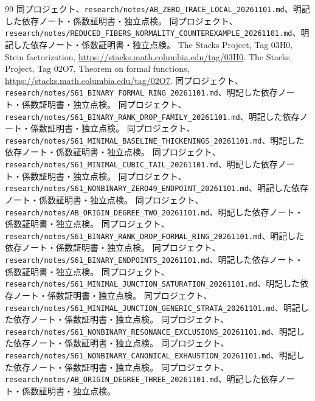 \documentclass[11pt,a4paper]{ltjsarticle}
\theoremstyle{remark}
\begin{document}
\begin{thebibliography}{99}
 同プロジェクト、\nolinkurl{research/notes/AB_ZERO_TRACE_LOCAL_20261101.md}、明記した依存ノート・係数証明書・独立点検。
 同プロジェクト、\nolinkurl{research/notes/REDUCED_FIBERS_NORMALITY_COUNTEREXAMPLE_20261101.md}、明記した依存ノート・係数証明書・独立点検。
 The Stacks Project, Tag 03H0, Stein factorization, \url{https://stacks.math.columbia.edu/tag/03H0}.
 The Stacks Project, Tag 02O7, Theorem on formal functions, \url{https://stacks.math.columbia.edu/tag/02O7}.
 同プロジェクト、\nolinkurl{research/notes/S61_BINARY_FORMAL_RING_20261101.md}、明記した依存ノート・係数証明書・独立点検。
 同プロジェクト、\nolinkurl{research/notes/S61_BINARY_RANK_DROP_FAMILY_20261101.md}、明記した依存ノート・係数証明書・独立点検。
 同プロジェクト、\nolinkurl{research/notes/S61_MINIMAL_BASELINE_THICKENINGS_20261101.md}、明記した依存ノート・係数証明書・独立点検。
 同プロジェクト、\nolinkurl{research/notes/S61_MINIMAL_CUBIC_TAIL_20261101.md}、明記した依存ノート・係数証明書・独立点検。
 同プロジェクト、\nolinkurl{research/notes/S61_NONBINARY_ZERO49_ENDPOINT_20261101.md}、明記した依存ノート・係数証明書・独立点検。
 同プロジェクト、\nolinkurl{research/notes/AB_ORIGIN_DEGREE_TWO_20261101.md}、明記した依存ノート・係数証明書・独立点検。
 同プロジェクト、\nolinkurl{research/notes/S61_BINARY_RANK_DROP_FORMAL_RING_20261101.md}、明記した依存ノート・係数証明書・独立点検。
 同プロジェクト、\nolinkurl{research/notes/S61_BINARY_ENDPOINTS_20261101.md}、明記した依存ノート・係数証明書・独立点検。
 同プロジェクト、\nolinkurl{research/notes/S61_MINIMAL_JUNCTION_SATURATION_20261101.md}、明記した依存ノート・係数証明書・独立点検。
 同プロジェクト、\nolinkurl{research/notes/S61_MINIMAL_JUNCTION_GENERIC_STRATA_20261101.md}、明記した依存ノート・係数証明書・独立点検。
 同プロジェクト、\nolinkurl{research/notes/S61_NONBINARY_RESONANCE_EXCLUSIONS_20261101.md}、明記した依存ノート・係数証明書・独立点検。
 同プロジェクト、\nolinkurl{research/notes/S61_NONBINARY_CANONICAL_EXHAUSTION_20261101.md}、明記した依存ノート・係数証明書・独立点検。
 同プロジェクト、\nolinkurl{research/notes/AB_ORIGIN_DEGREE_THREE_20261101.md}、明記した依存ノート・係数証明書・独立点検。

\end{thebibliography}
\end{document}
